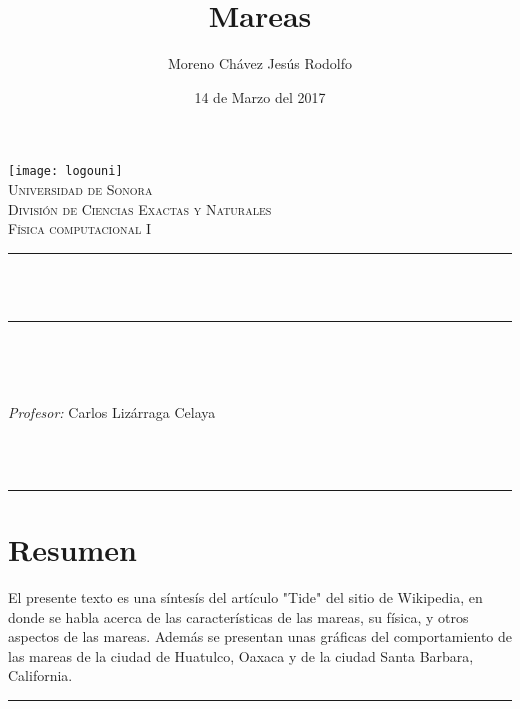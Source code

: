 \documentclass[12pt]{article}
\title{Mareas}		%
\author{\centering Moreno Chávez Jesús Rodolfo}											%
\date{14 de Marzo del 2017} %
\makeatletter
\let\thetitle\@title
\let\theauthor\@author
\let\thedate\@date
\makeatother
\begin{document}

\begin{titlepage}
	\centering
    \vspace*{0.5 cm}
    \texttt{[image: logouni]}\\[0.5 cm]	%
    \textsc{\Large Universidad de Sonora}\\[1.0 cm]	%
	\textsc{\Large División de Ciencias Exactas y Naturales}\\[0.5 cm]				%
	\textsc{\large Física computacional I}\\[0.5 cm]				%
	\rule{\linewidth}{0.2 mm} \\[0.4 cm]
	{ \huge \bfseries \thetitle}\\
	\rule{\linewidth}{0.2 mm} \\[0.5 cm]
	
	\begin{minipage}{\textwidth}
		\begin{flushleft} 
			\emph{\Large} \large \\
			\theauthor
			\end{flushleft}
	
		\begin{flushleft} 
			\emph{\Large Profesor:} \large \centering Carlos Lizárraga Celaya 	
			\end{flushleft}
	\end{minipage}\\[1 cm]
	{\large \thedate}\\[2 cm]
 
	\vfill
	
\end{titlepage}

\newpage
\hrule 
\section*{Resumen}
El presente texto es una síntesís del artículo "Tide" del sitio de Wikipedia, en donde se habla acerca de las características de las mareas, su física, y otros aspectos de las mareas. Además se presentan unas gráficas del comportamiento de las mareas de la ciudad de Huatulco, Oaxaca y de la ciudad Santa Barbara, California.
\vspace{0.5 cm}
\hrule
\vspace{0.9 cm}
\end{document}
